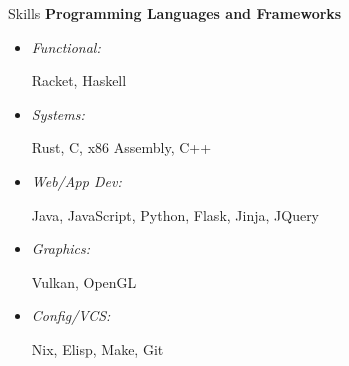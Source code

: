 \documentclass{resume} %
\begin{document}
\begin{rSection}{Skills}
  {\bf Programming Languages and Frameworks }
  \begin{itemize}
    \item \parbox{3cm}{\em Functional:} Racket, Haskell
    \item \parbox{3cm}{\em Systems:} Rust, C, x86 Assembly, C++
    \item \parbox{3cm}{\em Web/App Dev:} Java, JavaScript, Python, Flask, Jinja, JQuery
    \item \parbox{3cm}{\em Graphics:} Vulkan, OpenGL
    \item \parbox{3cm}{\em Config/VCS:} Nix, Elisp, Make, Git
  \end{itemize}
\end{rSection}
\end{document}

